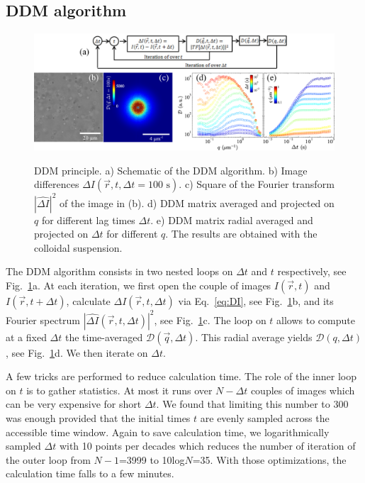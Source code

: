 \documentclass[prb,twocolumn,amsmath,amssymb]{revtex4-1}
\begin{document}
\subsection{DDM algorithm}
\label{sec:ddmalgo}

\begin{figure}
	\includegraphics[width=\linewidth]{Graph.pdf}\\
	\caption{DDM principle. a) Schematic of the DDM algorithm. b) Image differences $\Delta I(\vec{r}, t,\Delta t=100 \text{ s})$. c) Square of the Fourier transform $|\widehat{\Delta I}|^2$ of the image in  (b). d) DDM matrix averaged and projected on $q$ for different lag times $\Delta t$. e) DDM matrix radial averaged and projected on $\Delta t$ for different $q$.  The results are obtained with the colloidal suspension.}
	\label{fig:D}
\end{figure}

The DDM algorithm consists in two nested loops on $\Delta t$ and $t$ respectively, see Fig.~\ref{fig:D}a. At each iteration, we first open the couple of images $I(\vec{r},t)$ and $I(\vec{r},t+\Delta t)$, calculate $\Delta I(\vec{r},t, \Delta t)$ via Eq.~\eqref{eq:DI}, see Fig.~\ref{fig:D}b, and its Fourier spectrum $\left|\widehat{\Delta I}(\vec{r},t, \Delta t)\right|^2$, see Fig.~\ref{fig:D}c.  The loop on $t$ allows to compute at a fixed $\Delta t$ the time-averaged $\mathcal{D}(\vec{q}, \Delta t)$. This radial average yields $\mathcal{D}(q, \Delta t)$, see Fig.~\ref{fig:D}d. We then iterate on $\Delta t$.

A few tricks are performed to reduce calculation time. The role of the inner loop on $t$ is to gather statistics. At most it runs over $N-\Delta t$ couples of images which can be very expensive for short $\Delta t$. We found that limiting this number to 300 was enough provided that the initial times $t$ are evenly sampled across the accessible time window. Again to save calculation time, we logarithmically sampled $\Delta t$ with 10 points per decades which reduces the number of iteration of the outer loop from $N-1$=3999 to 10log$N$=35. With those optimizations, the calculation time falls to a few minutes. 
\end{document}
